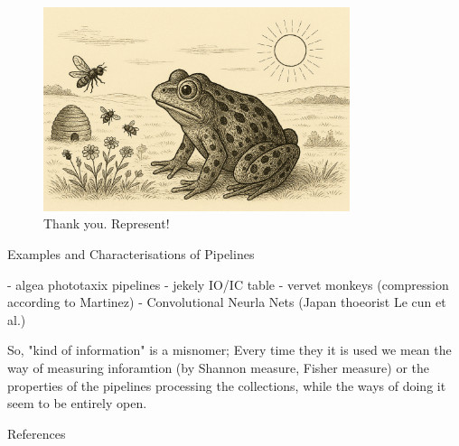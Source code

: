 \documentclass[10pt, aspectratio=169]{beamer}
\begin{document}
    
    \begin{frame}
        \begin{figure}[h!]
            \centering
            \includegraphics[width=0.8\textwidth]{images/frog_world.png}
            \caption{\Huge Thank you. Represent! }
            
        \end{figure}
      
    \end{frame}
    



    \begin{frame}{Examples and Characterisations of Pipelines }

        - algea phototaxix pipelines
        - jekely IO/IC table
        - vervet monkeys (compression according to Martinez)
        - Convolutional Neurla Nets (Japan thoeorist Le cun et al.)


    \end{frame}
    
\begin{frame}

    So, "kind of information" is a misnomer;
    Every time they it is used we mean  the way of measuring inforamtion (by Shannon measure, Fisher measure)  or the properties of the pipelines processing the collections, while the ways of doing it seem to be entirely open.

    

\end{frame}



    \begin{frame}[allowframebreaks]{References}
   \small
        \printbibliography
    \end{frame}



        
\end{document}
